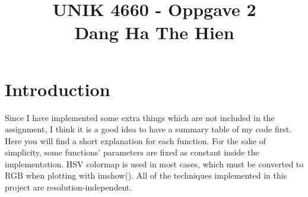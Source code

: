 \documentclass[10pt,a4paper]{article}
\title{UNIK 4660 - Oppgave 2 \\ Dang Ha The Hien}
\begin{document}
	\maketitle
	\section{Introduction}
	Since I have implemented some extra things which are not included in the assignment, I think it is a good idea to have a summary table of my code first. Here you will find a short explanation for each function.  For the sake of simplicity, some functions' parameters are fixed as constant inside the implementation. HSV colormap is used in most cases, which must be converted to RGB when plotting with imshow(). All of the techniques implemented in this project are resolution-independent.	\\
	
\end{document}
